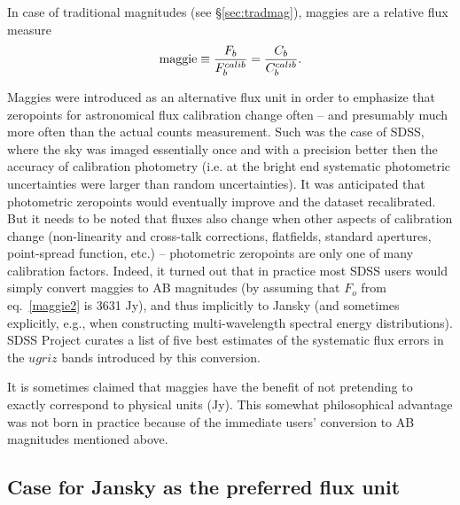 \documentclass{emulateapj}
\begin{document}
In case of traditional magnitudes (see \S\ref{sec:tradmag}), maggies are a 
relative flux measure
\begin{equation}
\label{maggie3}
    {\rm maggie} \equiv {F_b  \over F_b^{calib}} = {C_b  \over C_b^{calib}}. 
\end{equation}

Maggies were introduced as an alternative flux unit in order to emphasize
that zeropoints for astronomical flux calibration change often -- and 
presumably much more often than the actual counts measurement. Such 
was the case of SDSS, where the sky was imaged essentially once and with
a precision better then the accuracy of calibration photometry (i.e. at 
the bright end systematic photometric uncertainties were larger than 
random uncertainties). It was anticipated that photometric zeropoints 
would eventually improve and the dataset recalibrated.  But it needs to 
be noted that fluxes also change when other aspects of calibration change
(non-linearity and cross-talk corrections, flatfields, standard apertures, 
point-spread function, etc.) -- photometric zeropoints are only one of 
many calibration factors. Indeed, it turned out that in practice most 
SDSS users would simply convert maggies to AB magnitudes (by assuming
that $F_o$ from eq.~\ref{maggie2} is 3631 Jy), and thus
implicitly to Jansky (and sometimes explicitly, e.g., when constructing
multi-wavelength spectral energy distributions). SDSS Project curates a 
list of five best estimates of the systematic flux errors in the $ugriz$ 
bands introduced by this conversion. 
 
It is sometimes claimed that maggies have the benefit of not pretending 
to exactly correspond to physical units (Jy). This somewhat philosophical
advantage was not born in practice because of the immediate users' 
conversion to AB magnitudes mentioned above. 


\subsection{Case for Jansky as the preferred flux unit} 
\end{document}

